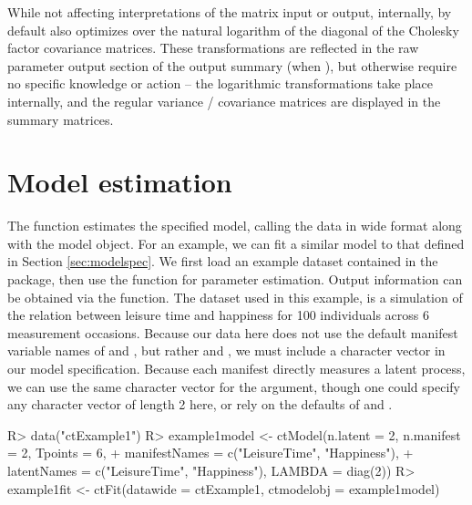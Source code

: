 \documentclass[nojss]{jss}\usepackage[]{graphicx}\usepackage[]{color}
\begin{document}
While not affecting interpretations of the matrix input or output, internally, by default  also optimizes over the natural logarithm of the diagonal of the Cholesky factor covariance matrices. These transformations are reflected in the raw  parameter output section of the output summary (when ), but otherwise require no specific knowledge or action -- the logarithmic transformations take place internally, and the regular variance / covariance matrices are displayed in the summary matrices. 


\section{Model estimation} \label{sec:modelfit}\nopagebreak
The  function estimates the specified model, calling the data in wide format along with the  model object. For an example, we can fit a similar model to that defined in Section \ref{sec:modelspec}. We first load an example dataset contained in the  package, then use the  function for parameter estimation. Output information can be obtained via the  function. The dataset used in this example, is a simulation of the relation between leisure time and happiness for 100 individuals across 6 measurement occasions.  Because our data here does not use the default manifest variable names of  and , but rather  and , we must include a  character vector in our model specification.  Because each manifest directly measures a latent process, we can use the same character vector for the  argument, though one could specify any character vector of length 2 here, or rely on the defaults of  and . 

\begin{Schunk}
\begin{Sinput}
R> data("ctExample1")
R> example1model <- ctModel(n.latent = 2, n.manifest = 2, Tpoints = 6, 
+   manifestNames = c("LeisureTime", "Happiness"), 
+   latentNames = c("LeisureTime", "Happiness"), LAMBDA = diag(2))
R> example1fit <- ctFit(datawide = ctExample1, ctmodelobj = example1model)
\end{Sinput}
\end{Schunk}
\end{document}
